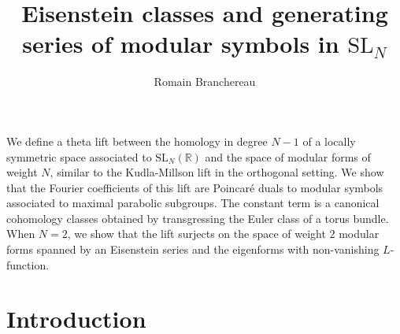 \documentclass[a4paper,11pt]{amsart} %
\newcommand{\8}{\infty}
\newcommand{\SL}{\mathrm{SL}}
\newcommand{\R}{\mathbb{R}}
\theoremstyle{mytheoremstyle}
\theoremstyle{remark}
\numberwithin{equation}{section}
\renewenvironment{abstract}
 {\small
  \begin{center}
  \bfseries \abstractname\vspace{-.5em}\vspace{10pt}
  \end{center}
  \list{}{
    \setlength{\leftmargin}{2cm}%
    \setlength{\rightmargin}{\leftmargin}%
  }%
  \item\relax}
 {\endlist}
\begin{document}
\title{Eisenstein classes and generating series of modular symbols in $\SL_N$}
\author{ Romain Branchereau}
\date{} %
\maketitle

\begin{abstract}We define a theta lift between the homology in degree $N-1$ of a locally symmetric space associated to $\SL_N(\R)$ and the space of modular forms of weight $N$, similar to the Kudla-Millson lift in the orthogonal setting. We show that the Fourier coefficients of this lift are Poincaré duals to modular symbols associated to maximal parabolic subgroups. The constant term is a canonical cohomology classes obtained by transgressing the Euler class of a torus bundle. When $N=2$, we show that the lift surjects on the space of weight $2$ modular forms spanned by an Eisenstein series and the eigenforms with non-vanishing $L$-function.
\end{abstract}

{
  \tableofcontents
}


\section{Introduction}
\thispagestyle{empty}
\end{document}
